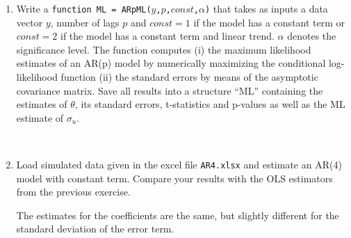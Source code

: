 \documentclass[a4paper]{scrartcl}
\begin{document}
\begin{enumerate}
\begin{enumerate}
                  \item Write a \texttt{function ML = ARpML($y$,$p$,$const$,$\alpha$)} that takes as inputs a data vector $y$, number of lags $p$ and $const=1$ if the model has a constant term or $const=2$ if the model has a constant term and linear trend. $\alpha$ denotes the significance level. The function computes (i) the maximum likelihood estimates of an AR(p) model by numerically maximizing the conditional log-likelihood function (ii) the standard errors by means of the asymptotic covariance matrix. Save all results into a structure \enquote{ML} containing the estimates of $\theta$, its standard errors, t-statistics and p-values as well as the ML estimate of $\sigma_u$.
                        \begin{solution}~
                            
                        \end{solution}
                  \item Load simulated data given in the excel file \texttt{AR4.xlsx} and estimate an AR(4) model with constant term. Compare your results with the OLS estimators from the previous exercise.
                        \begin{solution}
                            The estimates for the coefficients are the same, but slightly different for the standard deviation of the error term.
                            
                            \newpage %
                        \end{solution}
              \end{enumerate}
    \end{enumerate}
    \newpage
    
\end{document}
